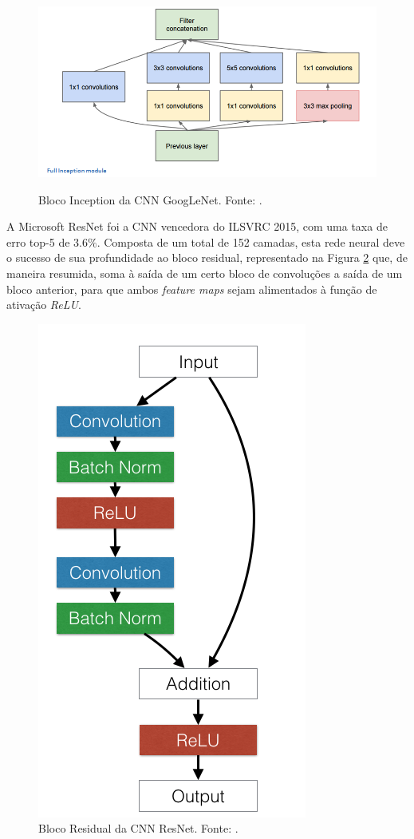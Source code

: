 \begin{figure}[!ht]
	\centering
	\caption{Bloco Inception da CNN GoogLeNet. Fonte: \cite{9dlpapers}.}
	\includegraphics[width=0.7\linewidth]{img/GoogLeNet}
	\label{fig:bloco_inception}
\end{figure}

A Microsoft ResNet foi a CNN vencedora do ILSVRC 2015, com uma taxa de erro top-5 de $3.6\%$. Composta de um total de 152 camadas, esta rede neural deve o sucesso de sua profundidade ao bloco residual, representado na Figura \ref{fig:bloco_residual} que, de maneira resumida, soma à saída de um certo bloco de convoluções a saída de um bloco anterior, para que ambos \emph{feature maps} sejam alimentados à função de ativação \emph{ReLU}.

\begin{figure}[!ht]
\centering
\caption{Bloco Residual da CNN ResNet. Fonte: \cite{torch:resnet}.}\label{fig:bloco_residual}
\includegraphics[height=0.3\textheight]{img/resnets_modelvariants}
\end{figure}

